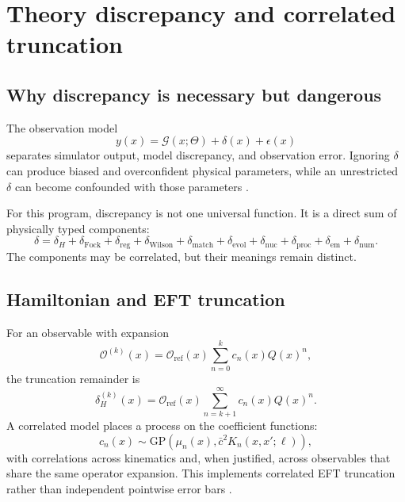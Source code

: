 \documentclass[11pt]{article}
\newcommand{\cO}{\mathcal O}
\newcommand{\cG}{\mathcal G}
\newcommand{\num}{\mathrm{num}}
\newcommand{\emul}{\mathrm{em}}
\newcommand{\matchp}{\mathrm{match}}
\newcommand{\evol}{\mathrm{evol}}
\newcommand{\wil}{\mathrm{Wilson}}
\newcommand{\nuc}{\mathrm{nuc}}
\newcommand{\proc}{\mathrm{proc}}
\newcommand{\reg}{\mathrm{reg}}
\newcommand{\GP}{\ensuremath{\mathrm{GP}}}
\begin{document}
\section{Theory discrepancy and correlated truncation}
\label{sec:discrepancy}

\subsection{Why discrepancy is necessary but dangerous}

The observation model
\begin{equation}
 y(x)=\cG(x;\Theta)+\delta(x)+\epsilon(x)
 \label{eq:basic-discrepancy}
\end{equation}
separates simulator output, model discrepancy, and observation error.
Ignoring \(\delta\) can produce biased and overconfident physical parameters,
while an unrestricted \(\delta\) can become confounded with those parameters
\cite{KennedyOHagan2001,BrynjarsdottirOHagan2014,Plumlee2017}.

For this program, discrepancy is not one universal function.  It is a direct
sum of physically typed components:
\begin{equation}
 \delta
 =
 \delta_H
 +\delta_{\mathrm{Fock}}
 +\delta_{\reg}
 +\delta_{\wil}
 +\delta_{\matchp}
 +\delta_{\evol}
 +\delta_{\nuc}
 +\delta_{\proc}
 +\delta_{\emul}
 +\delta_{\num}.
 \label{eq:discrepancy-decomposition}
\end{equation}
The components may be correlated, but their meanings remain distinct.

\subsection{Hamiltonian and EFT truncation}

For an observable with expansion
\begin{equation}
 \cO^{(k)}(x)
 =
 \cO_{\mathrm{ref}}(x)
 \sum_{n=0}^{k} c_n(x)Q(x)^n,
 \label{eq:eft-expansion}
\end{equation}
the truncation remainder is
\begin{equation}
 \delta_H^{(k)}(x)
 =
 \cO_{\mathrm{ref}}(x)
 \sum_{n=k+1}^{\infty} c_n(x)Q(x)^n.
 \label{eq:eft-remainder}
\end{equation}
A correlated model places a process on the coefficient functions:
\begin{equation}
 c_n(x)\sim
 \GP\!\left(
 \mu_n(x),
 \bar c^2 K_n(x,x';\ell)
 \right),
 \label{eq:eft-gp}
\end{equation}
with correlations across kinematics and, when justified, across observables
that share the same operator expansion.  This implements correlated EFT
truncation rather than independent pointwise error bars
\cite{Furnstahl2015,Melendez2019}.
\end{document}
